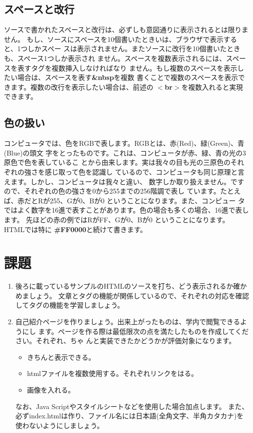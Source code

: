 \documentclass[12pt, a4j]{jsarticle}
\begin{document}
\subsection{スペースと改行}

ソースで書かれたスペースと改行は、必ずしも意図通りに表示されるとは限りません。
もし、ソースにスペースを10個書いたときいは、ブラウザで表示すると、1つしかスペー
スは表示されません。またソースに改行を10個書いたときも、スペース1つしか表示され
ません。スペースを複数表示されるには、スペースを表すタグを複数挿入しなければなり
ません。もし複数のスペースを表示したい場合は、スペースを表す{\bf \sf \&nbsp}を複数
書くことで複数のスペースを表示できます。複数の改行を表示したい場合は、前述の{\bf
\sf $<$br$>$}を複数入れると実現できます。

\subsection{色の扱い}
コンピュータでは、色をRGBで表します。RGBとは、赤(Red)、緑(Green)、青(Blue)の頭文
字をとったものです。これは、コンピュータが赤、緑、青の光の3原色で色を表しているこ
とから由来します。実は我々の目も光の三原色のそれぞれの強さを感じ取って色を認識し
ているので、コンピュータも同じ原理と言えます。しかし、コンピュータは我々と違い、
数字しか取り扱えません。ですので、それぞれの色の強さを0から255までの256階調で表し
ています。たとえば、赤だとRが255、Gが0、Bが0 ということになります。また、コンピュー
タではよく数字を16進で表すことがあります。色の場合も多くの場合、16進で表します。
先ほどの赤の例ではRがFF、Gが0、Bが0 ということになります。HTMLでは特に{\bf \sf
\#FF0000}と続けて書きます。


\section{課題}

\begin{enumerate}
\item 後ろに載っているサンプルのHTMLのソースを打ち、どう表示されるか確かめましょう。
      文章とタグの機能が関係しているので、それぞれの対応を確認してタグの機能を学習しましょう。

\item 自己紹介ページを作りましょう。出来上がったものは、学内で閲覧できるようにし
      ます。ページを作る際は最低限次の点を満たしたものを作成してください。それぞれ、ちゃ
      んと実装できたかどうかが評価対象になります。
      \begin{itemize}
          \item きちんと表示できる。
          \item htmlファイルを複数使用する。それぞれリンクをはる。
          \item 画像を入れる。
      \end{itemize}
      なお、Java Scriptやスタイルシートなどを使用した場合加点します。
      また、必ずindex.htmlは作り、ファイル名には日本語(全角文字、半角カタカナ)を使わないようにしましょう。
\end{enumerate}
\end{document}
